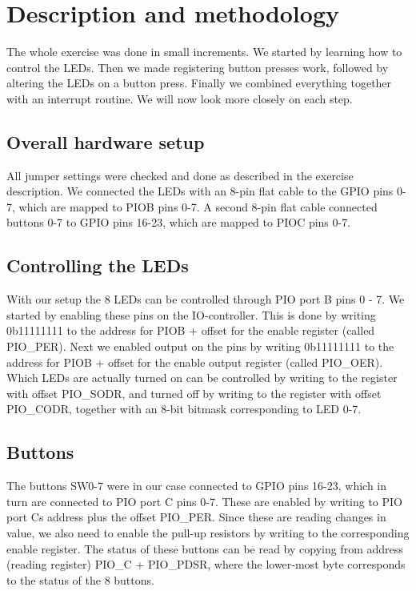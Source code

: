 \section{Description and methodology}


The whole exercise was done in small increments. We started by learning how to control the LEDs. Then we made registering button presses work, followed by altering the LEDs on a button press. Finally we combined everything together with an interrupt routine. We will now look more closely on each step.

\subsection{Overall hardware setup}

All jumper settings were checked and done as described in the exercise description. We connected the LEDs with an 8-pin flat cable to the GPIO pins 0-7, which are mapped to PIOB pins 0-7. A second 8-pin flat cable connected buttons 0-7 to GPIO pins 16-23, which are mapped to PIOC pins 0-7.

\subsection{Controlling the LEDs}

With our setup the 8 LEDs can be controlled through PIO port B pins 0 - 7. We started by enabling these pins on the IO-controller. This is done by writing 0b11111111 to the address for PIOB + offset for the enable register (called PIO\_PER). Next we enabled output on the pins by writing 0b11111111 to the address for PIOB + offset for the enable output register (called PIO\_OER). Which LEDs are actually turned on can be controlled by writing to the register with offset PIO\_SODR, and turned off by writing to the register with offset PIO\_CODR, together with an 8-bit bitmask corresponding to LED 0-7.

\subsection{Buttons}

The buttons SW0-7 were in our case connected to GPIO pins 16-23, which in turn are connected to PIO port C pins 0-7. These are enabled by writing to PIO port Cs address plus the offset PIO\_PER. Since these are reading changes in value, we also need to enable the pull-up resistors by writing to the corresponding enable register. The status of these buttons can be read by copying from address (reading register) PIO\_C + PIO\_PDSR, where the lower-most byte corresponds to the status of the 8 buttons.

